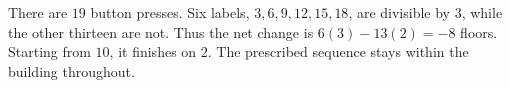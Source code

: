 There are $19$ button presses. Six labels, $3,6,9,12,15,18$, are divisible by $3$, while the other thirteen are not. Thus the net change is $6(3)-13(2)=-8$ floors. Starting from $10$, it finishes on $\boxed2$. The prescribed sequence stays within the building throughout.
